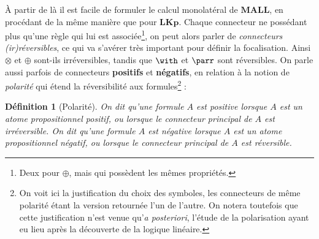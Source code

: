 \documentclass[12pt]{report}
\newcommand{\seq}{\vdash}
\newcommand{\irule}[1]{\footnotesize$#1$}
\newcommand{\iruleL}[1]{\irule{{#1}\seq}}
\newcommand{\iruleR}[1]{\irule{\seq{#1}}}
\newtheorem{definition}{Définition}
\begin{document}
\begin{center}
\end{center}

À partir de là il est facile de formuler le calcul monolatéral de $\mathbf{MALL}$, en procédant de la même manière que pour $\mathbf{LKp}$. Chaque connecteur ne possédant plus qu'une règle qui lui est associée\footnote{Deux pour $\oplus$, mais qui possèdent les mêmes propriétés.}, on peut alors parler de \emph{connecteurs (ir)réversibles}, ce qui va s'avérer très important pour définir la focalisation. Ainsi $\otimes$ et $\oplus$ sont-ils irréversibles, tandis que $\with$ et $\parr$ sont réversibles. On parle aussi parfois de connecteurs \textbf{positifs} et \textbf{négatifs}, en relation à la notion de \emph{polarité} qui étend la réversibilité aux formules\footnote{On voit ici la justification du choix des symboles, les connecteurs de même polarité étant la version retournée l'un de l'autre. On notera toutefois que cette justification n'est venue qu'\textit{a posteriori}, l'étude de la polarisation ayant eu lieu après la découverte de la logique linéaire.} :

\begin{definition}[Polarité]
	On dit qu'une formule $A$ est \emph{positive} lorsque $A$ est un atome propositionnel positif, ou lorsque le connecteur principal de $A$ est irréversible.
	On dit qu'une formule $A$ est \emph{négative} lorsque $A$ est un atome propositionnel négatif, ou lorsque le connecteur principal de $A$ est réversible.
\end{definition}
\end{document}
